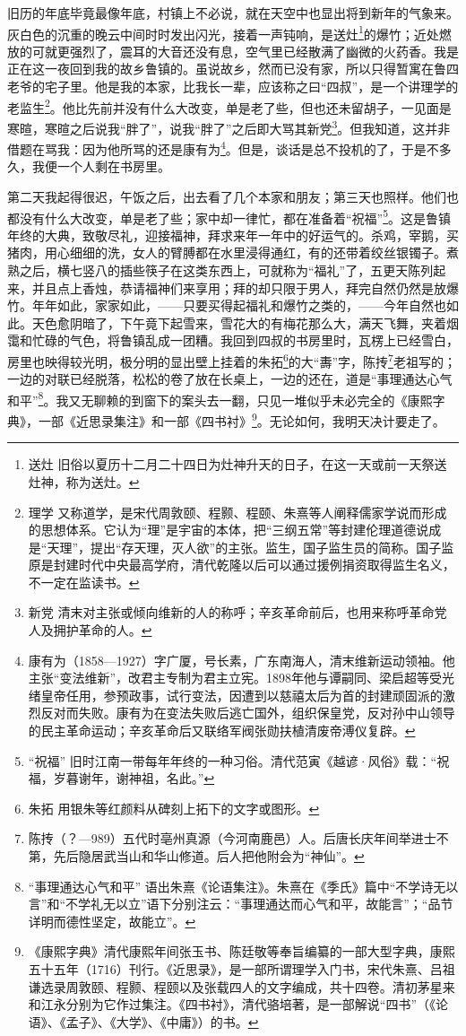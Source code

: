 \par 旧历的年底毕竟最像年底，村镇上不必说，就在天空中也显出将到新年的气象来。灰白色的沉重的晚云中间时时发出闪光，接着一声钝响，是送灶\footnote{送灶 旧俗以夏历十二月二十四日为灶神升天的日子，在这一天或前一天祭送灶神，称为送灶。}的爆竹；近处燃放的可就更强烈了，震耳的大音还没有息，空气里已经散满了幽微的火药香。我是正在这一夜回到我的故乡鲁镇的。虽说故乡，然而已没有家，所以只得暂寓在鲁四老爷的宅子里。他是我的本家，比我长一辈，应该称之曰“四叔”，是一个讲理学的老监生\footnote{理学 又称道学，是宋代周敦颐、程颢、程颐、朱熹等人阐释儒家学说而形成的思想体系。它认为“理”是宇宙的本体，把“三纲五常”等封建伦理道德说成是“天理”，提出“存天理，灭人欲”的主张。监生，国子监生员的简称。国子监原是封建时代中央最高学府，清代乾隆以后可以通过援例捐资取得监生名义，不一定在监读书。}。他比先前并没有什么大改变，单是老了些，但也还未留胡子，一见面是寒暄，寒暄之后说我“胖了”，说我“胖了”之后即大骂其新党\footnote{新党 清末对主张或倾向维新的人的称呼；辛亥革命前后，也用来称呼革命党人及拥护革命的人。}。但我知道，这并非借题在骂我：因为他所骂的还是康有为\footnote{康有为（1858—1927）字广厦，号长素，广东南海人，清末维新运动领袖。他主张“变法维新”，改君主专制为君主立宪。1898年他与谭嗣同、梁启超等受光绪皇帝任用，参预政事，试行变法，因遭到以慈禧太后为首的封建顽固派的激烈反对而失败。康有为在变法失败后逃亡国外，组织保皇党，反对孙中山领导的民主革命运动；辛亥革命后又联络军阀张勋扶植清废帝溥仪复辟。}。但是，谈话是总不投机的了，于是不多久，我便一个人剩在书房里。
\par 第二天我起得很迟，午饭之后，出去看了几个本家和朋友；第三天也照样。他们也都没有什么大改变，单是老了些；家中却一律忙，都在准备着“祝福”\footnote{“祝福” 旧时江南一带每年年终的一种习俗。清代范寅《越谚·风俗》载：“祝福，岁暮谢年，谢神祖，名此。”}。这是鲁镇年终的大典，致敬尽礼，迎接福神，拜求来年一年中的好运气的。杀鸡，宰鹅，买猪肉，用心细细的洗，女人的臂膊都在水里浸得通红，有的还带着绞丝银镯子。煮熟之后，横七竖八的插些筷子在这类东西上，可就称为“福礼”了，五更天陈列起来，并且点上香烛，恭请福神们来享用；拜的却只限于男人，拜完自然仍然是放爆竹。年年如此，家家如此，——只要买得起福礼和爆竹之类的，——今年自然也如此。天色愈阴暗了，下午竟下起雪来，雪花大的有梅花那么大，满天飞舞，夹着烟霭和忙碌的气色，将鲁镇乱成一团糟。我回到四叔的书房里时，瓦楞上已经雪白，房里也映得较光明，极分明的显出壁上挂着的朱拓\footnote{朱拓 用银朱等红颜料从碑刻上拓下的文字或图形。}的大“夀”字，陈抟\footnote{陈抟（？—989）五代时亳州真源（今河南鹿邑）人。后唐长庆年间举进士不第，先后隐居武当山和华山修道。后人把他附会为“神仙”。}老祖写的；一边的对联已经脱落，松松的卷了放在长桌上，一边的还在，道是“事理通达心气和平”\footnote{“事理通达心气和平” 语出朱熹《论语集注》。朱熹在《季氏》篇中“不学诗无以言”和“不学礼无以立”语下分别注云：“事理通达而心气和平，故能言”；“品节详明而德性坚定，故能立”。}。我又无聊赖的到窗下的案头去一翻，只见一堆似乎未必完全的《康熙字典》，一部《近思录集注》和一部《四书衬》\footnote{《康熙字典》清代康熙年间张玉书、陈廷敬等奉旨编纂的一部大型字典，康熙五十五年（1716）刊行。《近思录》，是一部所谓理学入门书，宋代朱熹、吕祖谦选录周敦颐、程颢、程颐以及张载四人的文字编成，共十四卷。清初茅星来和江永分别为它作过集注。《四书衬》，清代骆培著，是一部解说“四书”（《论语》、《孟子》、《大学》、《中庸》）的书。}。无论如何，我明天决计要走了。
